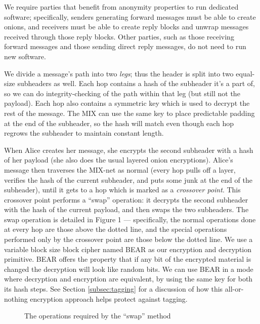 \documentclass{llncs}
\begin{document}
We require parties that benefit from anonymity properties to run dedicated
software; specifically, senders generating forward messages must be able
to create onions, and receivers must be able to create reply blocks
and unwrap messages received through those reply blocks. Other parties,
such as those receiving forward messages and those sending direct reply
messages, do not need to run new software.


We divide a message's path into two \emph{legs}; thus the header is
split into two equal-size subheaders as well. Each hop contains a hash
of the subheader it's a part of, so we can do integrity-checking of the
path within that leg (but still not the payload). Each hop also contains
a symmetric key which is used to decrypt the rest of the message. The
MIX can use the same key to place predictable padding at the end of
the subheader, so the hash will match even though each hop regrows the
subheader to maintain constant length.

When Alice creates her message, she encrypts the second subheader
with a hash of her payload (she also does the usual layered onion
encryptions). Alice's message then traverses the MIX-net as normal (every
hop pulls off a layer, verifies the hash of the current subheader,
and puts some junk at the end of the subheader), until it gets to a
hop which is marked as a \emph{crossover point}. This crossover point
performs a ``swap'' operation: it decrypts the second subheader with
the hash of the current payload, and then swaps the two subheaders. The
swap operation is detailed in Figure 1 --- specifically, the normal
operations done at every hop are those above the dotted line, and the
special operations performed only by the crossover point are those below
the dotted line.  We use a variable block size block cipher named BEAR
\cite{BEAR} as our encryption and decryption primitive. BEAR offers
the property that if any bit of the encrypted material is changed the
decryption will look like random bits. We can use BEAR in a mode where
decryption and encryption are equivalent, by using the same key for
both its hash steps. See Section \ref{subsec:tagging} for a discussion of
how this all-or-nothing encryption approach helps protect against tagging.

\begin{figure}
\begin{center}
\caption{The operations required by the ``swap'' method} 
\end{center}
\end{figure}
\end{document}
